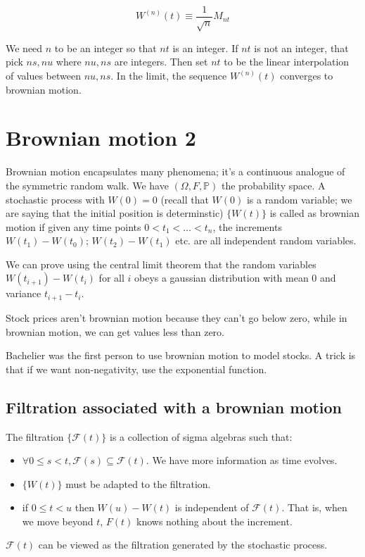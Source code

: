 \documentclass{book}
\newcommand{\F}{\ensuremath{\mathcal{F}}}
\renewcommand{\P}{\ensuremath{\mathbb{P}}}
\theoremstyle{definition}
\begin{document}
$$
W^{(n)}(t) \equiv \frac{1}{\sqrt n}M_{nt}
$$

We need $n$ to be an integer so that $nt$ is an integer. If $nt$ is not
an integer, that pick $ns, nu$ where $nu, ns$ are integers. Then set $nt$ to 
be the linear interpolation of values between $nu, ns$. In the limit, the
sequence $W^{(n)}(t)$ converges to brownian motion.

\chapter{Brownian motion 2}

Brownian motion encapsulates many phenomena; it's a continuous analogue
of the symmetric random walk. We have $(\Omega, F, \P)$ the probability space.
A stochastic process with $W(0) = 0$ (recall that $W(0)$ is a random variable; we
are saying that the initial position is determinstic)
$\{ W(t) \}$ is called as brownian motion if  given
any time points $0 < t_1 < \dots < t_n$, the increments $W(t_1) - W(t_0)$; 
$W(t_2) - W(t_1)$ etc. are all independent random variables.

We can prove using the central limit theorem  that the random variables
$W(t_{i+1}) - W(t_i)$ for all $i$ 
obeys a gaussian distribution with mean $0$ and variance $t_{i+1} - t_i$.

Stock prices aren't brownian motion because they can't go below zero, while
in brownian motion, we can get values less than zero. 

Bachelier was the first person to use brownian motion to model stocks.
A trick is that if we want non-negativity, use the exponential function.

\section{Filtration associated with a brownian motion}

The filtration $\{ \F(t) \}$ is a collection of sigma algebras such that:
\begin{itemize}
 \item $\forall 0 \leq s < t,  \F(s) \subseteq \F(t)$. We have more information as time evolves.
\item $\{ W(t) \}$ must be adapted to the filtration.
\item if $0 \leq t < u$ then $W(u) - W(t)$ is independent of $\F(t)$. That is,
    when we move beyond $t$, $F(t)$ knows nothing about the increment.
 \end{itemize}
 $\F(t)$ can be viewed as the filtration generated by the stochastic process.
\end{document}
